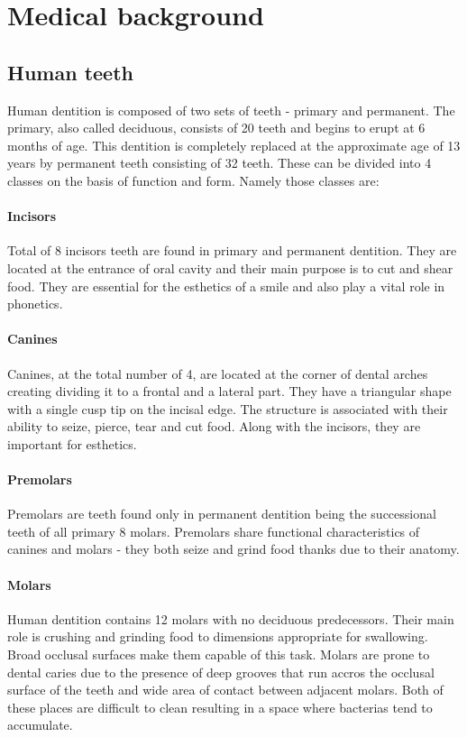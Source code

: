 \chapter{Medical background}

\section{Human teeth}
Human dentition is composed of two sets of teeth - primary and permanent. The primary, also called deciduous, consists of 20 teeth and begins to erupt at 6 months of age. This dentition is completely replaced at the approximate age of 13 years by permanent teeth consisting of 32 teeth. These can be divided into 4 classes on the basis of function and form. Namely those classes are:

\subsubsection*{Incisors}
Total of 8 incisors teeth are found in primary and permanent dentition. They are located at the entrance of oral cavity and their main purpose is to cut and shear food. They are essential for the esthetics of a smile and also play a vital role in phonetics.

\subsubsection*{Canines}
Canines, at the total number of 4, are located at the corner of dental arches creating dividing it to a frontal and a lateral part. They have a triangular shape with a single cusp tip on the incisal edge. The structure is associated with their ability to seize, pierce, tear and cut food. Along with the incisors, they are important for esthetics.

\subsubsection*{Premolars}
Premolars are teeth found only in permanent dentition being the successional teeth of all primary 8 molars. Premolars share functional characteristics of canines and molars - they both seize and grind food thanks due to their anatomy.

\subsubsection*{Molars}
Human dentition contains 12 molars with no deciduous predecessors. Their main role is crushing and grinding food to dimensions appropriate for swallowing. Broad occlusal surfaces make them capable of this task. Molars are prone to dental caries due to the presence of deep grooves that run accros the occlusal surface of the teeth and wide area of contact between adjacent molars. Both of these places are difficult to clean resulting in a space where bacterias tend to accumulate.


